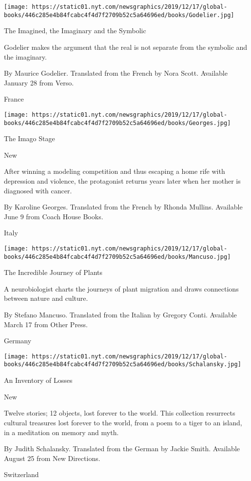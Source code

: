 \texttt{[image: https://static01.nyt.com/newsgraphics/2019/12/17/global-books/446c285e4b84fcabc4f4d7f2709b52c5a64696ed/books/Godelier.jpg]}

The Imagined, the Imaginary and the Symbolic

Godelier makes the argument that the real is not separate from the
symbolic and the imaginary.

 By Maurice Godelier. Translated from the French by Nora Scott.
Available January 28 from Verso.

France

\texttt{[image: https://static01.nyt.com/newsgraphics/2019/12/17/global-books/446c285e4b84fcabc4f4d7f2709b52c5a64696ed/books/Georges.jpg]}

The Imago Stage

New

After winning a modeling competition and thus escaping a home rife with
depression and violence, the protagonist returns years later when her
mother is diagnosed with cancer.

 By Karoline Georges. Translated from the French by Rhonda Mullins.
Available June 9 from Coach House Books.

Italy

\texttt{[image: https://static01.nyt.com/newsgraphics/2019/12/17/global-books/446c285e4b84fcabc4f4d7f2709b52c5a64696ed/books/Mancuso.jpg]}

The Incredible Journey of Plants

A neurobiologist charts the journeys of plant migration and draws
connections between nature and culture.

 By Stefano Mancuso. Translated from the Italian by Gregory Conti.
Available March 17 from Other Press.

Germany

\texttt{[image: https://static01.nyt.com/newsgraphics/2019/12/17/global-books/446c285e4b84fcabc4f4d7f2709b52c5a64696ed/books/Schalansky.jpg]}

An Inventory of Losses

New

Twelve stories; 12 objects, lost forever to the world. This collection
resurrects cultural treasures lost forever to the world, from a poem to
a tiger to an island, in a meditation on memory and myth.

 By Judith Schalansky. Translated from the German by Jackie Smith.
Available August 25 from New Directions.

Switzerland

